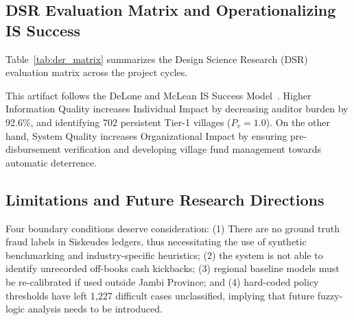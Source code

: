 \documentclass[conference]{IEEEtran}
\begin{document}
\subsection{DSR Evaluation Matrix and Operationalizing IS Success}

Table~\ref{tab:dsr_matrix} summarizes the Design Science Research (DSR) evaluation matrix across the project cycles.

\begin{table}[htbp]
\centering
\caption{Design Science Research (DSR) Evaluation Matrix}
\label{tab:dsr_matrix}
\setlength{\tabcolsep}{2.5pt}
\renewcommand{\arraystretch}{0.94}
\end{table}


This artifact follows the DeLone and McLean IS Success Model~\cite{ref10}. Higher Information Quality increases Individual Impact by decreasing auditor burden by 92.6\%, and identifying 702 persistent Tier-1 villages ($P_v = 1.0$). On the other hand, System Quality increases Organizational Impact by ensuring pre-disbursement verification and developing village fund management towards automatic deterrence.

\subsection{Limitations and Future Research Directions}

Four boundary conditions deserve consideration: (1) There are no ground truth fraud labels in Siskeudes ledgers, thus necessitating the use of synthetic benchmarking and industry-specific heuristics; (2) the system is not able to identify unrecorded off-books cash kickbacks; (3) regional baseline models must be re-calibrated if used outside Jambi Province; and (4) hard-coded policy thresholds have left 1,227 difficult cases unclassified, implying that future fuzzy-logic analysis needs to be introduced.
\end{document}
